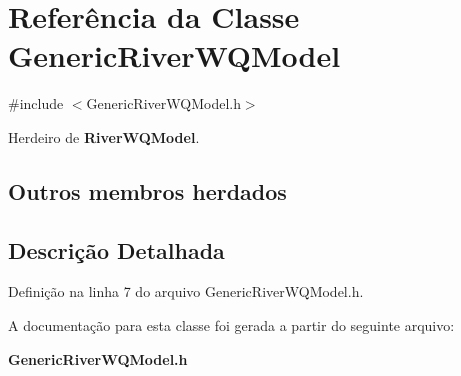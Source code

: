 \section{Referência da Classe Generic\+River\+W\+Q\+Model}
\label{class_generic_river_w_q_model}


{\ttfamily \#include $<$Generic\+River\+W\+Q\+Model.\+h$>$}



Herdeiro de {\bf River\+W\+Q\+Model}.

\subsection*{Outros membros herdados}


\subsection{Descrição Detalhada}


Definição na linha 7 do arquivo Generic\+River\+W\+Q\+Model.\+h.



A documentação para esta classe foi gerada a partir do seguinte arquivo\+:\begin{DoxyCompactItemize}
\item 
{\bf Generic\+River\+W\+Q\+Model.\+h}\end{DoxyCompactItemize}

